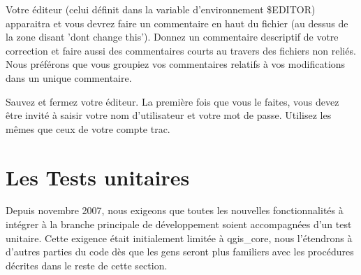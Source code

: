 Votre éditeur (celui définit dans la variable d'environnement \$EDITOR) apparaitra et vous devrez faire un commentaire en haut du fichier (au dessus de la zone disant 'dont change this'). Donnez un commentaire descriptif de votre correction et faire aussi des commentaires courts au travers des fichiers non reliés. Nous préférons que vous groupiez vos commentaires relatifs à vos modifications dans un unique commentaire.

Sauvez et fermez votre éditeur. La première fois que vous le faites, vous devez être invité à saisir votre nom d'utilisateur et votre mot de passe. Utilisez les mêmes que ceux de votre compte trac.

\section{Les Tests unitaires}
Depuis novembre 2007, nous exigeons que toutes les nouvelles fonctionnalités à intégrer à la branche principale de développement soient accompagnées d'un test unitaire. Cette exigence était initialement limitée à qgis\_core, nous l'étendrons à d'autres parties du code dès que les gens seront plus familiers avec les procédures décrites dans le reste de cette section.

